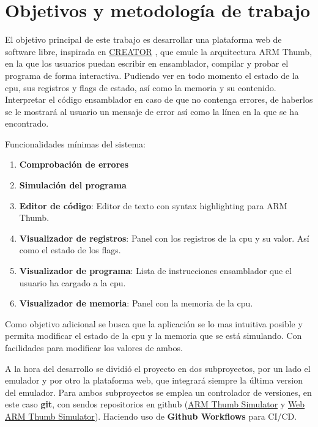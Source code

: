 \section{Objetivos y metodología de trabajo}
{
    El objetivo principal de este trabajo es desarrollar una plataforma web de software libre, inspirada en \href{https://creatorsim.github.io/creator/}{CREATOR} , que emule la arquitectura ARM Thumb, en la que los usuarios puedan escribir en ensamblador, compilar y probar el programa de forma interactiva.
    Pudiendo ver en todo momento el estado de la cpu, sus registros y flags de estado, así como la memoria y su contenido. \\

    Interpretar el código ensamblador en caso de que no contenga errores, de haberlos se le mostrará al usuario un mensaje de error así como la línea en la que se ha encontrado. 
    
    Funcionalidades mínimas del sistema:
    \begin{enumerate}
        \item \textbf{Comprobación de errores}
        \item \textbf{Simulación del programa}
        \item \textbf{Editor de código}: Editor de texto con syntax highlighting para ARM Thumb.
        \item \textbf{Visualizador de registros}: Panel con los registros de la cpu y su valor. Así como el estado de los flags.
        \item \textbf{Visualizador de programa}: Lista de instrucciones ensamblador que el usuario ha cargado a la cpu.
        \item \textbf{Visualizador de memoria}: Panel con la memoria de la cpu.
    \end{enumerate}

    Como objetivo adicional se busca que la aplicación se lo mas intuitiva posible y permita modificar el estado de la cpu y la memoria que se está simulando. Con facilidades para modificar los valores de ambos. \\
    \clearpage

    A la hora del desarrollo se dividió el proyecto en dos subproyectos, por un lado el emulador y por otro la plataforma web, que integrará siempre la última version del emulador.
    Para ambos subproyectos se emplea un controlador de versiones, en este caso \textbf{git}, con sendos repositorios en github (\href{https://github.com/FreddyJS/armthumb-emul}{ARM Thumb Simulator} y \href{https://github.com/FreddyJS/wthumb}{Web ARM Thumb Simulator}).
    Haciendo uso de \textbf{Github Workflows} para CI/CD. \\

}
